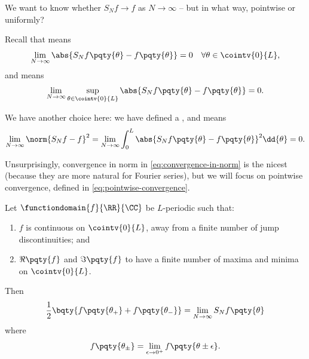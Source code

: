 We want to know whether \(S_N f \to f\) as \(N \to \infty\) -- but in what way, pointwise or uniformly?

Recall that  means
\begin{equation}
    \label{eq:pointwise-convergence}%
    \lim_{N \to \infty} \abs{S_N f\pqty{\theta} - f\pqty{\theta}} = 0\quad \forall \theta \in \cointv{0}{L},
\end{equation}
and   means
\begin{equation}
    \lim_{N \to \infty} \sup_{\theta \in \cointv{0}{L}} \abs{S_N f\pqty{\theta} - f\pqty{\theta}} = 0.
\end{equation}

We have another choice here: we have defined a , and  means
\begin{equation}
    \label{eq:convergence-in-norm}%
    \lim_{N \to \infty} \norm{S_N f - f}^2 = \lim_{N \to \infty} \int_{0}^{L} \abs{S_N f\pqty{\theta} - f\pqty{\theta}}^2 \dd{\theta} = 0.
\end{equation}

Unsurprisingly, convergence in norm in \eqref{eq:convergence-in-norm} is the nicest (because they are more natural for Fourier series), but we will focus on pointwise convergence, defined in \eqref{eq:pointwise-convergence}.

\begin{proposition}
    \label{prop:fourier-series-convergence}%
    Let \(\functiondomain{f}{\RR}{\CC}\) be \(L\)-periodic such that:
    \begin{enumerate}
        \item \(f\) is continuous on \(\cointv{0}{L}\), away from a finite number of jump discontinuities; and
        \item \(\Re \pqty{f}\) and \(\Im \pqty{f}\) to have a finite number of maxima and minima on \(\cointv{0}{L}\).
    \end{enumerate}

    Then
    \begin{equation}
        \frac{1}{2} \bqty{f\pqty{\theta_+} + f\pqty{\theta_-}} = \lim_{N \to \infty} S_N f\pqty{\theta}
    \end{equation}
    where
    \begin{equation}
        f\pqty{\theta_{\pm}} = \lim_{\epsilon \to 0^{+}} f\pqty{\theta \pm \epsilon}.
    \end{equation}
\end{proposition}

